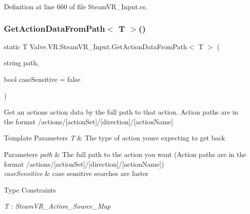 Definition at line 660 of file Steam\+V\+R\+\_\+\+Input.\+cs.

\mbox{\label{class_valve_1_1_v_r_1_1_steam_v_r___input_a364b175a0b854190e86408807800cbe6}} 
\subsubsection{\texorpdfstring{GetActionDataFromPath$<$ T $>$()}{GetActionDataFromPath< T >()}}
{\footnotesize\ttfamily static T Valve.\+V\+R.\+Steam\+V\+R\+\_\+\+Input.\+Get\+Action\+Data\+From\+Path$<$ T $>$ (\begin{DoxyParamCaption}\item[{string}]{path,  }\item[{bool}]{case\+Sensitive = {\ttfamily false} }\end{DoxyParamCaption})\hspace{0.3cm}{\ttfamily [static]}}



Get an action\textquotesingle{}s action data by the full path to that action. Action paths are in the format /actions/\mbox{[}action\+Set\mbox{]}/\mbox{[}direction\mbox{]}/\mbox{[}action\+Name\mbox{]} 


\begin{DoxyTemplParams}{Template Parameters}
{\em T} & The type of action you\textquotesingle{}re expecting to get back\\
\hline
\end{DoxyTemplParams}

\begin{DoxyParams}{Parameters}
{\em path} & The full path to the action you want (Action paths are in the format /actions/\mbox{[}action\+Set\mbox{]}/\mbox{[}direction\mbox{]}/\mbox{[}action\+Name\mbox{]})\\
\hline
{\em case\+Sensitive} & case sensitive searches are faster\\
\hline
\end{DoxyParams}
\begin{Desc}
\item[Type Constraints]\begin{description}
\item[{\em T} : {\em Steam\+V\+R\+\_\+\+Action\+\_\+\+Source\+\_\+\+Map}]\end{description}
\end{Desc}


